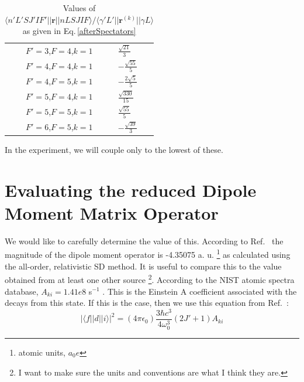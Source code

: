 \begin{table}[h!]
\centering
\begin{tabular}{|c|l|}
\hline
$F'=3$,$F=4$,$k=1$&$\frac{ \sqrt{21}}{3}$\\ 
$F'=4$,$F=4$,$k=1$&$- \frac{\sqrt{55}}{5}$ \\ 
$F'=4$,$F=5$,$k=1$&$- \frac{2\sqrt{5}}{5}$\\ 
$F'=5$,$F=4$,$k=1$&$\frac{\sqrt{330}}{15}$\\ 
$F'=5$,$F=5$,$k=1$&$\frac{\sqrt{55}}{5}$\\ 
$F'=6$,$F=5$,$k=1$&$- \frac{\sqrt{39}}{3}$\\ 
\hline
\end{tabular}
\caption{Values of $\langle n' L' S J' I F' ||\mathbf{r}||n L S J I F\rangle / \langle \gamma' L' ||\mathbf{r}^{(k)}|| \gamma L\rangle$ as given in Eq.\,\ref{afterSpectators}
}
\label{coefficient_calculated}
\end{table}

In the experiment, we will couple only to the lowest of these. 

\section{Evaluating the reduced Dipole Moment Matrix Operator}
We would like to carefully determine the value of this. According to Ref.\ \cite{safronova2photon} the magnitude of the dipole moment operator is -4.35075 a. u. \footnote{atomic units, $a_0 e$} as calculated using the all-order, relativistic SD method. It is useful to compare this to the value obtained from at least one other source \footnote{I want to make sure the units and conventions are what I think they are.}. According to the NIST atomic spectra database, $A_{ki}=1.41e8$ s$^{-1}$ \cite{NISTasd}. This is the Einstein A coefficient associated with the decays from this state. If this is the case, then we use this equation from Ref.\ \cite{demilleBudkerKimball}:  
\begin{equation}
|\langle f ||d|| i \rangle|^2 = (4 \pi \epsilon_0) \frac{3 \hbar c^3}{4 \omega_0^3} (2 J'+1) A_{ki}\label{budkerAeqn} 
\end{equation}


